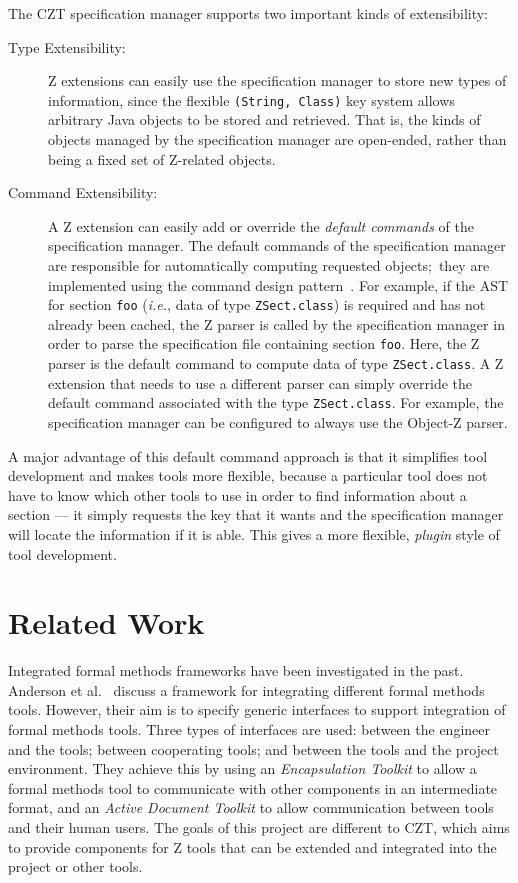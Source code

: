 \documentclass{llncs}
\newcommand{\Interface}[1]{\texttt{#1}}
\begin{document}
  The CZT specification manager supports two important kinds of
  extensibility:
  \begin{description}
  \item[Type Extensibility:] Z extensions can easily use the
    specification manager to store new types of information, since the
    flexible \texttt{(String, Class)} key system allows arbitrary Java objects
    to be stored and retrieved.  That is, the kinds of objects managed
    by the specification manager are open-ended, rather than being a
    fixed set of Z-related objects.
  \item[Command Extensibility:] A Z extension can easily add or
    override the \emph{default commands} of the specification manager.
    The default commands of the specification manager are responsible
    for automatically computing requested objects;~they are
    implemented using the command design pattern~\cite{GamEA:95}. For
    example, if the AST for section \texttt{foo} (\textit{i.e.}, data
    of type \Interface{ZSect.class}) is required and has not already been
    cached, the Z parser is called by the specification manager in
    order to parse the specification file containing section
    \texttt{foo}.  Here, the Z parser is the default command to
    compute data of type \Interface{ZSect.class}.  A Z extension that
    needs to use a different parser can simply override the default
    command associated with the type \Interface{ZSect.class}.  For
    example, the specification manager can be configured to always use
    the Object-Z parser.
    \end{description}

  A major advantage of this default command approach is that it
  simplifies tool development and makes tools more flexible, because a
  particular tool does not have to know which other tools to use in
  order to find information about a section --- it simply requests the
  key that it wants and the specification manager will locate the
  information if it is able.  This gives a more flexible,
  \emph{plugin} style of tool development.

\section{Related Work}\label{sec:related-work}

  Integrated formal methods frameworks have been investigated in the
  past. Anderson et al.\ \cite{uitp-anderson} discuss a framework for
  integrating different formal methods tools. However, their aim is to
  specify generic interfaces to support integration of formal methods
  tools. Three types of interfaces are used: between the engineer and
  the tools; between cooperating tools; and between the tools and the
  project environment. They achieve this by using an {\em
  Encapsulation Toolkit} to allow a formal methods tool to communicate
  with other components in an intermediate format, and an {\em Active
  Document Toolkit} to allow communication between tools and their
  human users. The goals of this project are different to CZT, which
  aims to provide components for Z tools that can be extended and
  integrated into the project or other tools.
\end{document}
